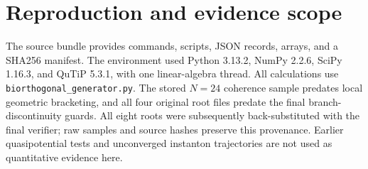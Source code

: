 \documentclass[aps,pra,10pt,onecolumn,superscriptaddress,amsmath,amssymb]{revtex4-2}
\begin{document}
\section{Reproduction and evidence scope}
The source bundle provides commands, scripts, JSON records, arrays, and a SHA256 manifest. The environment used Python 3.13.2, NumPy 2.2.6, SciPy 1.16.3, and QuTiP 5.3.1, with one linear-algebra thread. All calculations use \texttt{biorthogonal\_generator.py}. The stored $N=24$ coherence sample predates local geometric bracketing, and all four original root files predate the final branch-discontinuity guards. All eight roots were subsequently back-substituted with the final verifier; raw samples and source hashes preserve this provenance. Earlier quasipotential tests and unconverged instanton trajectories are not used as quantitative evidence here.
\end{document}
